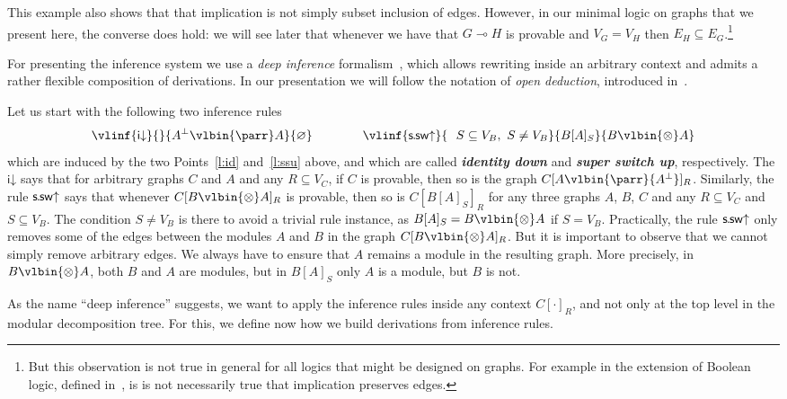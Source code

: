 \documentclass{lmcs} %
\def\limp{\multimap}
\renewcommand{\emptyset}{\varnothing}
\def\unit{\emptyset}
\def\defn#1{\emph{\bfseries\boldmath #1}}
\newcommand{\coons}[2]{[#1]_{#2}}														%
\newcommand{\coonso}[1]{[\cdot]_{#1}}
\def\idr{\dirule}
\def\ssur{\ussrule}
\def\cneg#1{{#1^\bot}}
\def\lpar{\vlbin{\parr}}
\def\ltens{\vlbin{\otimes}}
\def\irule{\mathsf{i}}
\def\dirule{\irule\mathord{\downarrow}}
\def\ssrule{\mathsf{s\mkern-1mu.\mkern-1mu sw}}
\def\ussrule{\ssrule\mathord{\uparrow}}
\def\gA{A}
\def\gB{B}
\def\gC{C}
\def\gG{G}
\def\gH{H}
\newcommand{\vertices}[1][]{V_{#1}}
\newcommand{\gEdges}[1][]{E_{#1}}
\newcommand{\vB}{\vertices[B]}
\newcommand{\vC}{\vertices[C]}
\newcommand{\vG}{\vertices[G]}
\newcommand{\eG}{\gEdges[G]}
\newcommand{\vH}{\vertices[H]}
\newcommand{\eH}{\gEdges[H]}
\theoremstyle{plain}
\begin{document}
This example also shows that that implication is not simply subset inclusion of
edges. However, in our minimal logic on graphs that we present here, the converse does hold: we will see later that whenever we
  have that $\gG\limp\gH$ is provable and $\vG=\vH$ then $\eH\subseteq\eG$.\footnote{But this
  observation is not true in general for all logics that might be designed on graphs. For example
  in the extension of Boolean logic, defined in~\cite{CDW:ext-bool},
  is is not necessarily true that implication preserves edges.}


For presenting the inference system we use a \emph{deep inference}
formalism~\cite{gug:str:01,gug:SIS}, which allows rewriting inside an
arbitrary context and admits a rather flexible composition of
derivations. In our presentation we will follow the notation of
\emph{open deduction}, introduced in~\cite{gug:gun:par:2010}.

Let us start with the following two inference rules
\begin{equation}\label{eq:id-ssu} 
  \vlinf{\idr}{}{\cneg\gA\lpar\gA}{\unit}
  \qquad\qquad
  \vlinf{\ssur}{~~S\subseteq\vB,~S\neq\vB}{\gB\coons{\gA}S}{\gB\ltens\gA}
\end{equation}
which are induced by the two Points~\ref{l:id} and~\ref{l:ssu}
above, and which are called \defn{identity down} and \defn{super switch up}, respectively.
The $\idr$ says that for arbitrary graphs $\gC$ and $\gA$ and any
$R\subseteq\vC$, if $\gC$ is provable, then so is the graph
$\gC\coons{\gA\lpar\cneg\gA}R$. Similarly, the rule $\ssur$ says that
whenever $\gC\coons{\gB\ltens\gA}R$ is provable, then so is
$\gC\coons{\gB\coons{\gA}S}R$ for any three graphs $\gA$, $\gB$, $\gC$
and any $R\subseteq\vC$ and $S\subseteq\vB$. The condition $S\neq\vB$
is there to avoid a trivial rule instance, as
$\gB\coons{\gA}S=\gB\ltens\gA$ if $S=\vB$.  Practically, the rule
$\ssur$ only removes some of the edges between the modules $A$ and $B$ in
the graph $\gC\coons{\gB\ltens\gA}R$. But it is important to observe
that we cannot simply remove arbitrary edges. We always have to ensure
that $A$ remains a module in the resulting graph. More precisely, in $\gB\ltens\gA$, both $\gB$ and $\gA$ are modules, but in $\gB\coons{\gA}S$ only $\gA$ is a module, but $\gB$ is not.


As the name ``deep inference'' suggests, we want to apply the inference rules inside any context $\gC\coonso R$, and not only at the top level in the modular decomposition tree. For this, we define now how we build derivations from inference rules.
\end{document}
